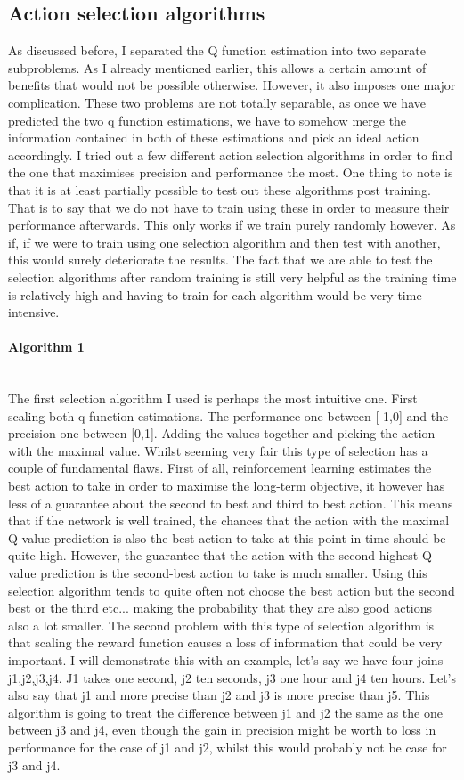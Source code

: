 \subsection{Action selection algorithms}
As discussed before, I separated the Q function estimation into two separate subproblems. As I already mentioned earlier, this allows a certain amount of benefits that would not be possible otherwise. However, it also imposes one major complication. These two problems are not totally separable, as once we have predicted the two q function estimations, we have to somehow merge the information contained in both of these estimations and pick an ideal action accordingly. I tried out a few different action selection algorithms in order to find the one that maximises precision and performance the most. One thing to note is that it is at least partially possible to test out these algorithms post training. That is to say that we do not have to train using these in order to measure their performance afterwards. This only works if we train purely randomly however. As if, if we were to train using one selection algorithm and then test with another, this would surely deteriorate the results. The fact that we are able to test the selection algorithms after random training is still very helpful as the training time is relatively high and having to train for each algorithm would be very time intensive.
\paragraph{Algorithm 1}\mbox{}\\
The first selection algorithm I used is perhaps the most intuitive one. First scaling both q function estimations. The performance one between [-1,0] and the precision one between [0,1]. Adding the values together and picking the action with the maximal value. Whilst seeming very fair this type of selection has a couple of fundamental flaws. First of all, reinforcement learning estimates the best action to take in order to maximise the long-term objective, it however has less of a guarantee about the second to best and third to best action. This means that if the network is well trained, the chances that the action with the maximal Q-value prediction is also the best action to take at this point in time should be quite high. However, the guarantee that the action with the second highest Q-value prediction is the second-best action to take is much smaller. Using this selection algorithm tends to quite often not choose the best action but the second best or the third etc... making the probability that they are also good actions also a lot smaller. The second problem with this type of selection algorithm is that scaling the reward function causes a loss of information that could be very important. I will demonstrate this with an example, let's say we have four joins j1,j2,j3,j4. J1 takes one second, j2 ten seconds, j3 one hour and j4 ten hours. Let's also say that j1 and more precise than j2 and j3 is more precise than j5. This algorithm is going to treat the difference between j1 and j2 the same as the one between j3 and j4, even though the gain in precision might be worth to loss in performance for the case of j1 and j2, whilst this would probably not be case for j3 and j4.
